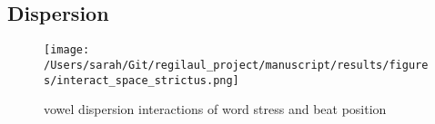 %
\subsection{Dispersion}
\begin{figure}[htb]
\begin{center}
\texttt{[image: /Users/sarah/Git/regilaul\_project/manuscript/results/figures/interact\_space\_strictus.png]}


\caption{vowel dispersion interactions of word stress and beat position}
\label{density}
\end{center}
\end{figure}










